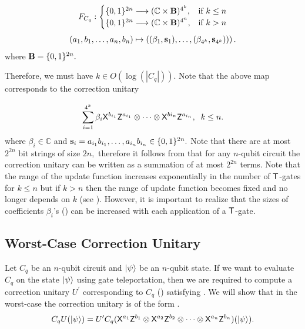 \begin{equation}
\label{nqubit:eq0}
\begin{aligned}
 F_{C_q}:
\begin{cases}
    \{0,1\}^{2n}\longrightarrow  (\mathbb{C} \times {\bf B})^{4^k},& \text{if } k\leq n\\
     \{0,1\}^{2n}\longrightarrow  (\mathbb{C} \times {\bf B})^{4^n}, & \text{if } k> n\\
\end{cases}
\end{aligned}
\end{equation}
\begin{equation}
\begin{aligned}
 (a_1,b_1,\ldots, a_n,b_n) \mapsto \left((\beta_1, {\bf s}_1),\dots, (\beta_{4^k}, {\bf s}_{4^k}))\right).
\end{aligned}
\end{equation}
where  ${\bf B}=\{0,1\}^{2n}.$

Therefore, we must have $k\in O(\log(|C_q|))$.  Note that the above map corresponds to the correction unitary 



 \begin{equation}
\label{exp:nqubit-correction}
\sum_{i=1}^{4^k} \beta_i {\sf X}^{b_{i_1}} {\sf Z}^{a_{i_1}}\otimes \cdots \otimes {\sf X}^{b{i_n}} {\sf Z}^{a_{i_n}},\;  \; k\leq n.
\end{equation}
where $\beta_i\in\mathbb{C}$ and ${\bf s}_i=a_{i_1}b_{i_1}, \ldots, a_{i_n}b_{i_n} \in\{0,1\}^{2n}.$  Note that there are at most $2^{2n}$ bit strings of size $2n,$ therefore it follows from  that for any $n$-qubit circuit the correction unitary can be written as a summation of at most $2^{2n}$ terms. Note that the range of the update function increases exponentially in the number of ${\sf T}$-gates for $k\leq n$ but if $k>n$ then the range of update function becomes fixed and no longer depends on $k$ (see ). However, it is important to realize that the sizes of coefficients $\beta_i$'s () can be increased with each application of a ${\sf T}$-gate.

\subsection{Worst-Case Correction Unitary}
Let $C_q$ be an $n$-qubit circuit and ${\lvert}\psi\rangle$ be an $n$-qubit state. If we want to evaluate $C_q$ on the state ${\lvert}\psi\rangle$ using gate teleportation, then we are required to compute a correction unitary $U^\prime$ corresponding to $C_q$ () satisfying . We will show that in the worst-case the correction unitary is of the form . 
\begin{equation}
\label{nqubit:eq6}
C_qU({\lvert}\psi\rangle)= U^\prime C_q ({\sf X}^{a_{1}}{\sf Z}^{b_{1}}\otimes {\sf X}^{a_{2}}{\sf Z}^{b_{2}}\otimes \cdots \otimes {\sf X}^{a_{n}}{\sf Z}^{b_{n}})({\lvert}\psi\rangle).
\end{equation}

